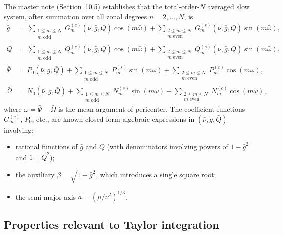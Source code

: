 \documentclass[11pt]{article}
\begin{document}
The master note (Section~10.5) establishes that the total-order-$N$ averaged
slow system, after summation over all zonal degrees $n = 2, \ldots, N$, is
\begin{align}
\dot{\bar g}
&=
\sum_{\substack{1 \le m \le N \\ m\;\mathrm{odd}}}
G^{(c)}_m(\bar\nu, \bar g, \bar Q)\cos(m\bar\omega)
+
\sum_{\substack{2 \le m \le N \\ m\;\mathrm{even}}}
G^{(s)}_m(\bar\nu, \bar g, \bar Q)\sin(m\bar\omega),
\label{eq:gdot}\\
\dot{\bar Q}
&=
\sum_{\substack{1 \le m \le N \\ m\;\mathrm{odd}}}
Q^{(c)}_m(\bar\nu, \bar g, \bar Q)\cos(m\bar\omega)
+
\sum_{\substack{2 \le m \le N \\ m\;\mathrm{even}}}
Q^{(s)}_m(\bar\nu, \bar g, \bar Q)\sin(m\bar\omega),
\label{eq:Qdot}\\
\dot{\bar\Psi}
&=
P_0(\bar\nu, \bar g, \bar Q)
+
\sum_{\substack{1 \le m \le N \\ m\;\mathrm{odd}}}
P^{(s)}_m \sin(m\bar\omega)
+
\sum_{\substack{2 \le m \le N \\ m\;\mathrm{even}}}
P^{(c)}_m \cos(m\bar\omega),
\label{eq:Psidot}\\
\dot{\bar\Omega}
&=
N_0(\bar\nu, \bar g, \bar Q)
+
\sum_{\substack{1 \le m \le N \\ m\;\mathrm{odd}}}
N^{(s)}_m \sin(m\bar\omega)
+
\sum_{\substack{2 \le m \le N \\ m\;\mathrm{even}}}
N^{(c)}_m \cos(m\bar\omega),
\label{eq:Omegadot}
\end{align}
where $\bar\omega = \bar\Psi - \bar\Omega$ is the mean argument of
pericenter. The coefficient functions $G^{(c)}_m$, $P_0$, etc., are known
closed-form algebraic expressions in $(\bar\nu, \bar g, \bar Q)$ involving:
\begin{itemize}
\item rational functions of $\bar g$ and $\bar Q$ (with denominators
involving powers of $1 - \bar g^2$ and $1 + \bar Q^2$);
\item the auxiliary $\bar\beta = \sqrt{1 - \bar g^2}$, which introduces a
single square root;
\item the semi-major axis $\bar a = (\mu/\bar\nu^2)^{1/3}$.
\end{itemize}

\subsection{Properties relevant to Taylor integration}
\end{document}
